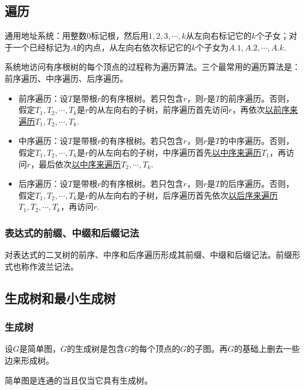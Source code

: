 \subsection{遍历}
通用地址系统：用整数0标记根，然后用$1,2,3,\cdots,k$从左向右标记它的$k$个子女；对于一个已经标记为$A$的内点，从左向右依次标记它的$k$个子女为$A.1, A.2, \cdots, A.k$.

系统地访问有序根树的每个顶点的过程称为遍历算法。三个最常用的遍历算法是：前序遍历、中序遍历、后序遍历。

\begin{itemize}
    \item 前序遍历：设$T$是带根$r$的有序根树。若只包含$r$，则$r$是$T$的前序遍历。否则，假定$T_1,T_2,\cdots,T_k$是$r$的从左向右的子树，前序遍历首先访问$r$，再依次\uline{以前序来遍历}$T_1,T_2,\cdots,T_k$.
    \item 中序遍历：设$T$是带根$r$的有序根树。若只包含$r$，则$r$是$T$的中序遍历。否则，假定$T_1,T_2,\cdots,T_k$是$r$的从左向右的子树，中序遍历首先\uline{以中序来遍历}$T_1$，再访问$r$，最后依次\uline{以中序来遍历}$T_2,\cdots,T_k$.
    \item 后序遍历：设$T$是带根$r$的有序根树。若只包含$r$，则$r$是$T$的后序遍历。否则，假定$T_1,T_2,\cdots,T_k$是$r$的从左向右的子树，后序遍历首先依次\uline{以后序来遍历}$T_1,T_2,\cdots,T_k$，再访问$r$.
\end{itemize}

\subsubsection*{表达式的前缀、中缀和后缀记法}
对表达式的二叉树的前序、中序和后序遍历形成其前缀、中缀和后缀记法。前缀形式也称作波兰记法。

\subsection{生成树和最小生成树}

\subsubsection*{生成树}
设$G$是简单图，$G$的生成树是包含$G$的每个顶点的$G$的子图。再$G$的基础上删去一些边来形成树。

简单图是连通的当且仅当它具有生成树。

